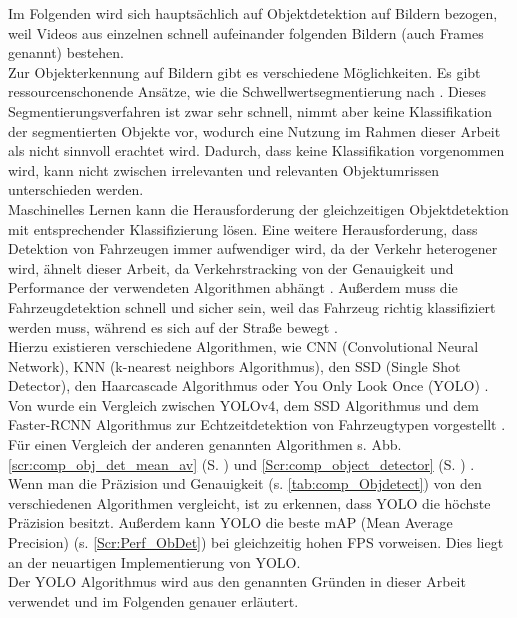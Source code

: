 {Im Folgenden wird sich hauptsächlich auf Objektdetektion auf Bildern bezogen, weil Videos aus einzelnen schnell aufeinander folgenden Bildern (auch Frames genannt) bestehen. \\
Zur Objekterkennung auf Bildern gibt es verschiedene Möglichkeiten. Es gibt ressourcenschonende Ansätze, wie die Schwellwertsegmentierung nach \citeauthor{Otsu1979} \cite{Otsu1979}. Dieses Segmentierungsverfahren ist zwar sehr schnell, nimmt aber keine Klassifikation der segmentierten Objekte vor, wodurch eine Nutzung im Rahmen dieser Arbeit als nicht sinnvoll erachtet wird. Dadurch, dass keine Klassifikation vorgenommen wird, kann nicht zwischen irrelevanten und relevanten Objektumrissen unterschieden werden. \\
Maschinelles Lernen kann die Herausforderung der gleichzeitigen Objektdetektion mit entsprechender Klassifizierung lösen. Eine weitere Herausforderung, dass Detektion von Fahrzeugen immer aufwendiger wird, da der Verkehr heterogener wird, ähnelt dieser Arbeit, da Verkehrstracking von der Genauigkeit und Performance der verwendeten Algorithmen abhängt \citep{Pavani2022}. Außerdem muss die Fahrzeugdetektion schnell und sicher sein, weil das Fahrzeug richtig klassifiziert werden muss, während es sich auf der Straße bewegt \citep{Kim2020_2}. \\
Hierzu existieren verschiedene Algorithmen, wie CNN (\glqq Convolutional Neural Network\grqq{}), KNN (\glqq k-nearest neighbors\grqq{} Algorithmus), den SSD (\glqq Single Shot Detector\grqq), den Haarcascade Algorithmus oder \glqq You Only Look Once\grqq{} (YOLO) \citep{Pavani2022, Kim2020_2}. \\
Von \citeauthor{Kim2020_2} \cite{Kim2020_2} wurde ein Vergleich zwischen YOLOv4, dem SSD Algorithmus und dem Faster-RCNN Algorithmus zur Echtzeitdetektion von Fahrzeugtypen vorgestellt \citep{Kim2020_2}. Für einen Vergleich der anderen genannten Algorithmen s. Abb. \ref{scr:comp_obj_det_mean_av} (S. \pageref{scr:comp_obj_det_mean_av}) und \ref{Scr:comp_object_detector} (S. \pageref{Scr:comp_object_detector}) \citep{Pavani2022}. \\
Wenn man die Präzision und Genauigkeit (s. \ref{tab:comp_Objdetect}) von den verschiedenen Algorithmen vergleicht, ist zu erkennen, dass YOLO die höchste Präzision besitzt. Außerdem kann YOLO die beste mAP (Mean Average Precision) (s. \ref{Scr:Perf_ObDet}) bei gleichzeitig hohen FPS vorweisen.  Dies liegt an der neuartigen Implementierung von YOLO. \\
Der YOLO Algorithmus wird aus den genannten Gründen in dieser Arbeit verwendet und im Folgenden genauer erläutert.

 }


